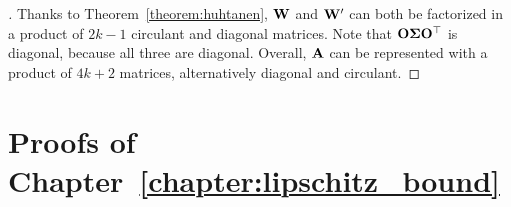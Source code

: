 \begin{proof}[]
Thanks to Theorem~\ref{theorem:huhtanen}, $\mathbf{W}$ and $\mathbf{W}'$ can both be factorized in a product of $2k-1$ circulant and diagonal matrices.
Note that $\mathbf{O} \mathbf{\Sigma} \mathbf{O}^\top$ is diagonal, because all three are diagonal.
Overall, $\mathbf{A}$ can be represented with a product of $4k+2$ matrices, alternatively diagonal and circulant.
\end{proof}




\section{Proofs of Chapter~\ref{chapter:lipschitz_bound}}

